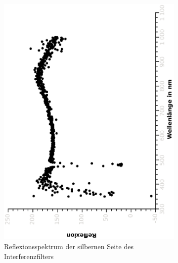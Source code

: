 \documentclass{article}
\begin{document}
\begin{figure}[H]
\begin{subfigure}[h]{0.4\textwidth}
\includegraphics[width=\textwidth ,angle=-90]{eps/interreflsilber.eps}
\caption{Reflexionsspektrum der \label{fig:silverrefl} silbernen Seite des Interferenzfilters}
\end{subfigure}
\begin{subfigure}[h]{0.4\textwidth}

\end{subfigure}
\end{figure}
\end{document}
